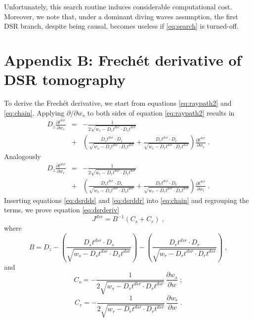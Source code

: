 Unfortunately, this search routine induces considerable computational cost. Moreover, we note 
that, under a dominant diving waves assumption, the first DSR branch, despite being 
causal, becomes useless if \ref{eq:search} is turned-off.

\appendix
\section{Appendix B: Frech\'{e}t derivative of DSR tomography}

To derive the Frech\'{e}t derivative, we start from equations \ref{eq:raypath2} and 
\ref{eq:chain}. Applying $\partial / \partial w_s$ to both sides of equation \ref{eq:raypath2} results in 
\begin{eqnarray}
\label{eq:dsrdds}
D_z \frac{\partial t^{dsr}}{\partial w_s} &=& 
- \frac{1}{2 \sqrt{w_s - D_s t^{dsr} \cdot D_s t^{dsr}}} \nonumber \\
&+& \left(\frac{D_s t^{dsr} \cdot D_s}{\sqrt{w_s - D_s t^{dsr} \cdot D_s t^{dsr}}} 
+ \frac{D_r t^{dsr} \cdot D_r}{\sqrt{w_r - D_r t^{dsr} \cdot D_r t^{dsr}}}\right) 
\frac{\partial t^{dsr}}{\partial w_s}\;.
\end{eqnarray}
Analogously
\begin{eqnarray}
\label{eq:dsrddr}
D_z \frac{\partial t^{dsr}}{\partial w_r} &=& 
- \frac{1}{2 \sqrt{w_r - D_r t^{dsr} \cdot D_r t^{dsr}}} \nonumber \\
&+& \left(\frac{D_s t^{dsr} \cdot D_s}{\sqrt{w_s - D_s t^{dsr} \cdot D_s t^{dsr}}} 
+ \frac{D_r t^{dsr} \cdot D_r}{\sqrt{w_r - D_r t^{dsr} \cdot D_r t^{dsr}}}\right) 
\frac{\partial t^{dsr}}{\partial w_r}\;.
\end{eqnarray}
Inserting equations \ref{eq:dsrdds} and \ref{eq:dsrddr} into \ref{eq:chain} and regrouping the terms, we prove 
equation \ref{eq:dsrderiv}
\begin{equation}
\label{eq:dsrderivapp}
J^{dsr} = B^{-1} (C_s + C_r)\;,
\end{equation}
where 
\begin{equation}
\label{eq:dsrderiv1}
B = D_z 
- \left( \frac{D_s t^{dsr} \cdot D_s}{\sqrt{w_s - D_s t^{dsr} \cdot D_s t^{dsr}}} \right) 
- \left( \frac{D_r t^{dsr} \cdot D_r}{\sqrt{w_r - D_r t^{dsr} \cdot D_r t^{dsr}}} \right)\;,
\end{equation}
and
\begin{equation}
\label{eq:dsrderiv2}
C_s = 
- \frac{1}{2 \sqrt{w_s - D_s t^{dsr} \cdot D_s t^{dsr}}}\, 
\frac{\partial w_s}{\partial w}\;;
\end{equation}
\begin{equation}
\label{eq:dsrderiv3}
C_r = 
- \frac{1}{2 \sqrt{w_r - D_r t^{dsr} \cdot D_r t^{dsr}}}\, 
\frac{\partial w_r}{\partial w}\;.
\end{equation}

